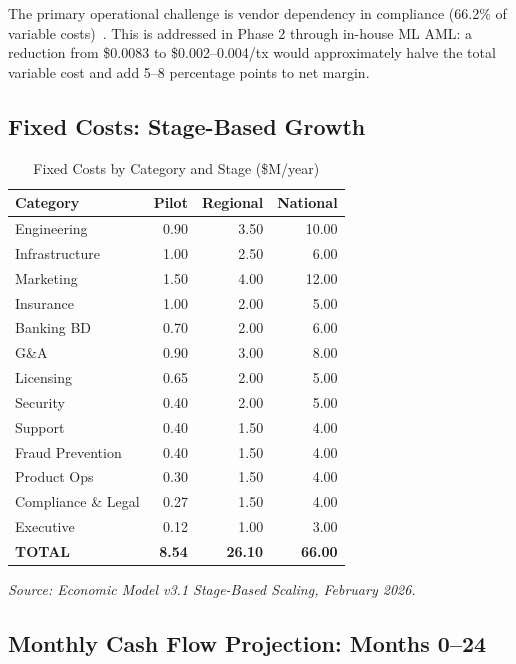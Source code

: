 \documentclass[11pt,a4paper]{article}
\newcommand{\tablesource}[1]{%
\par\vspace{3pt}%
{\footnotesize\color{gray!80}\textit{Source: #1}}%
\par\vspace{2pt}%
}
\begin{document}
The primary operational challenge is vendor dependency in compliance (66.2\% of variable costs)~\cite{mckinsey_aml,lexisnexis_aml}. This is addressed in Phase 2 through in-house ML AML: a reduction from \$0.0083 to \$0.002--0.004/tx would approximately halve the total variable cost and add 5--8 percentage points to net margin.

\subsection*{Fixed Costs: Stage-Based Growth}

\begin{table}[htbp]
\centering
\caption{Fixed Costs by Category and Stage (\$M/year)}
\small
\begin{tabularx}{\linewidth}{@{}lRRR@{}}
\toprule
\textbf{Category} & \textbf{Pilot} & \textbf{Regional} & \textbf{National} \\
\midrule
Engineering         & 0.90 & 3.50 & 10.00 \\
Infrastructure      & 1.00 & 2.50 &  6.00 \\
Marketing           & 1.50 & 4.00 & 12.00 \\
Insurance           & 1.00 & 2.00 &  5.00 \\
Banking BD          & 0.70 & 2.00 &  6.00 \\
G\&A                & 0.90 & 3.00 &  8.00 \\
Licensing           & 0.65 & 2.00 &  5.00 \\
Security            & 0.40 & 2.00 &  5.00 \\
Support             & 0.40 & 1.50 &  4.00 \\
Fraud Prevention    & 0.40 & 1.50 &  4.00 \\
Product Ops         & 0.30 & 1.50 &  4.00 \\
Compliance \& Legal & 0.27 & 1.50 &  4.00 \\
Executive           & 0.12 & 1.00 &  3.00 \\
\midrule
\textbf{TOTAL}      & \textbf{8.54} & \textbf{26.10} & \textbf{66.00} \\
\bottomrule
\end{tabularx}
\tablesource{Economic Model v3.1 Stage-Based Scaling, February 2026.}
\end{table}

\subsection*{Monthly Cash Flow Projection: Months 0--24}
\end{document}
